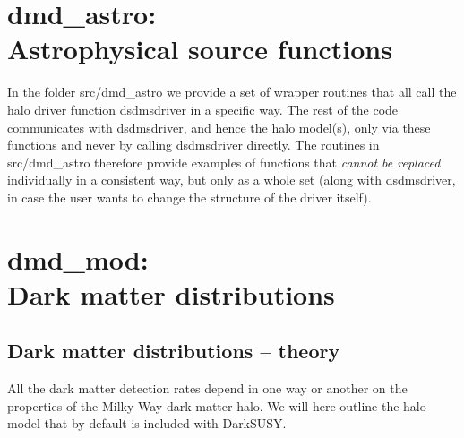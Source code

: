 \documentclass[a4paper,10pt,oneside]{book}
\newcommand{\code}[1]{\ft{#1}}
\newcommand{\codeb}[1]{\ftb{#1}}
\newcommand{\ds}{{\sffamily DarkSUSY}}
\newcommand{\ft}[1]{\textsf{#1}}
\newcommand{\ftb}[1]{{\bfseries \sffamily #1}}
\begin{document}
\chapter[dmd\_astro: Astrophysical source functions]{\codeb{dmd\_astro}:\\ Astrophysical source functions}
\label{ch:src/dmd_astro}


In the folder \code{src/dmd\_astro} we provide a set of wrapper
routines that all call the halo driver function \code{dsdmsdriver} in 
a specific way. The rest of the code communicates with \code{dsdmsdriver},
and hence the halo model(s), only via these functions and never by 
calling \code{dsdmsdriver} directly. The routines in  \code{src/dmd\_astro} 
therefore provide examples of functions that {\it cannot be
replaced} individually in a consistent way, but only as a whole set 
(along with \code{dsdmsdriver},
in case the user wants to change the structure of the driver itself).  

\chapter[dmd\_mod: Dark matter distributions]{\codeb{dmd\_mod}:\\ Dark matter distributions}
\label{ch:src/dmd_mod}


\section{Dark matter distributions -- theory}
\label{sec:halo}

All the dark matter detection rates depend in one way or another on
the properties of the Milky Way dark matter halo. We will here outline
the halo model that by default is included with \ds.
\end{document}
